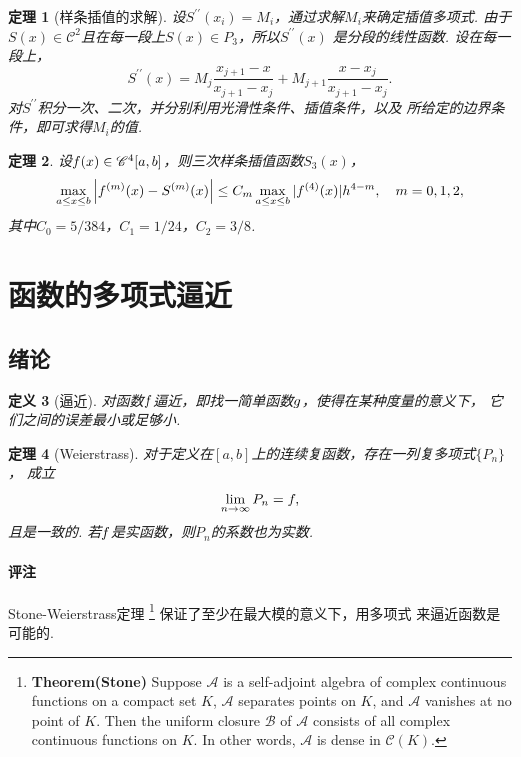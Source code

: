 \documentclass[12pt, a4paper]{article}
\theoremstyle{margin}
\newtheorem{thm}{定理}
\newtheorem{defi}[thm]{定义}
\newcommand{\pr}{\prime}
\newcommand{\ms}{\mathscr}
\newcommand{\tbf}{\textbf}
\newcommand{\f}{\mathnormal{f}}
\newcommand{\g}{\mathnormal{g}}
\newcommand{\remark}{\paragraph{评注}}
\begin{document}
  \begin{thm}[样条插值的求解]
    设$S^{\pr\pr}(x_i) = M_i$，通过求解$M_i$来确定插值多项式.
    由于$S(x)\in\ms{C}^2$且在每一段上$S(x)\in P_3$，所以$S^{\pr\pr}(x)$
    是分段的线性函数. 设在每一段上，
    \[
      S^{\pr\pr}(x) = M_j\frac{x_{j+1}-x}{x_{j+1}-x_j}
      + M_{j+1}\frac{x-x_j}{x_{j+1}-x_j}.
    \]
    对$S^{\pr\pr}$积分一次、二次，并分别利用光滑性条件、插值条件，以及
    所给定的边界条件，即可求得$M_i$的值.
  \end{thm}

  \begin{thm}
    设$\f(x)\in\ms{C}^4[a, b]$，则三次样条插值函数$S_3(x)$，
    \[
      \max_{a\le x\le b}\left| \f^{(m)}(x) - S^{(m)}(x) \right|
      \le C_m \max_{a\le x\le b}|\f^{(4)}(x)|h^{4-m},\quad
      m=0,1,2,
    \]
    其中$C_0 = 5/384$，$C_1 = 1/24$，$C_2 = 3/8$.
  \end{thm}

\newpage
\section{函数的多项式逼近}
\subsection{绪论}
  \begin{defi}[逼近]
    对函数$\f$逼近，即找一简单函数$\g$，使得在某种度量的意义下，
    它们之间的误差最小或足够小.
  \end{defi}

  \begin{thm}[Weierstrass]
    对于定义在$[a, b]$上的连续复函数，存在一列复多项式$\{P_n\}$，
    成立
    \[
      \lim_{n\to\infty}P_n = \f,
    \]
    且是一致的. 若$\f$是实函数，则$P_n$的系数也为实数.
  \end{thm}
  \remark
    Stone-Weierstrass定理
    \footnote{
      \tbf{Theorem(Stone) }
      Suppose $\ms{A}$ is a self-adjoint algebra of complex
      continuous functions on a compact set $K$, $\ms{A}$
      separates points on $K$, and $\ms{A}$ vanishes at no
      point of $K$. Then the uniform closure $\ms{B}$ of
      $\ms{A}$ consists of all complex continuous functions
      on $K$. In other words, $\ms{A}$ is dense in $\ms{C}(K)$.
    }
    保证了至少在最大模的意义下，用多项式
    来逼近函数是可能的.
\end{document}
